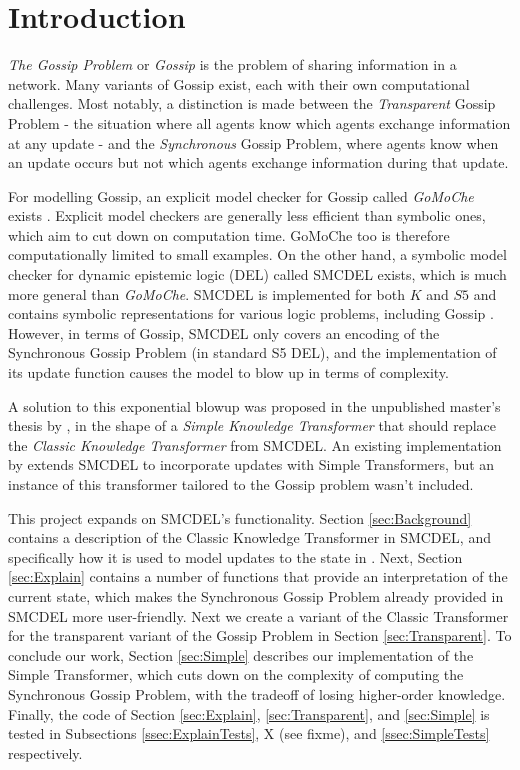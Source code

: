 \section{Introduction}

\textit{The Gossip Problem} or \textit{Gossip} is the problem of sharing information in a network. 
Many variants of Gossip exist, each with their own computational challenges. 
Most notably, a distinction is made between the \textit{Transparent} Gossip Problem - the situation where all agents know 
which agents exchange information at any update - and the \textit{Synchronous} Gossip Problem, where agents know when an 
update occurs but not which agents exchange information during that update.

For modelling Gossip, an explicit model checker for Gossip called \textit{GoMoChe} exists \cite{gattinger2023gomoche}. 
Explicit model checkers are generally less efficient than symbolic ones, which aim to cut down on computation time. 
GoMoChe too is therefore computationally limited to small examples. On the other hand, 
a symbolic model checker for dynamic epistemic logic (DEL) called SMCDEL exists, which is much more general than \textit{GoMoChe}. 
SMCDEL is implemented for
both $K$ and $S5$ and contains symbolic representations for various logic problems, including Gossip \cite{GattingerThesis2018}. 
However, in terms of Gossip, SMCDEL only covers an encoding of the Synchronous Gossip 
Problem (in standard S5 DEL), and the implementation of its update function causes the model to blow up in terms of 
complexity.

A solution to this exponential blowup was proposed in the unpublished master's thesis by \cite{danielMasterThesis}, in the shape 
of a \textit{Simple Knowledge Transformer} that should replace the \textit{Classic Knowledge Transformer} from SMCDEL. An existing 
implementation by \cite{HaitianHanabi} extends SMCDEL to incorporate updates with Simple Transformers, but an instance of this transformer
tailored to the Gossip problem wasn't included. 

This project expands on SMCDEL's functionality. Section \ref{sec:Background} contains a description of 
the Classic Knowledge Transformer in SMCDEL, and 
specifically how it is used to model updates to the state in \cite{GattingerThesis2018}. 
Next, Section \ref{sec:Explain} contains a number of functions that provide an interpretation of the current state, 
which makes the Synchronous Gossip Problem already provided in SMCDEL more user-friendly. 
Next we create a variant of the Classic Transformer for the transparent variant of the Gossip Problem in Section \ref{sec:Transparent}. 
To conclude our work, Section \ref{sec:Simple} describes our implementation of the Simple Transformer, 
which cuts down on the complexity of computing the Synchronous Gossip Problem, with the tradeoff of losing higher-order knowledge. 
Finally, the code of Section \ref{sec:Explain}, \ref{sec:Transparent}, and \ref{sec:Simple} is tested in Subsections \ref{ssec:ExplainTests}, 
X (see fixme), and \ref{ssec:SimpleTests} respectively.

